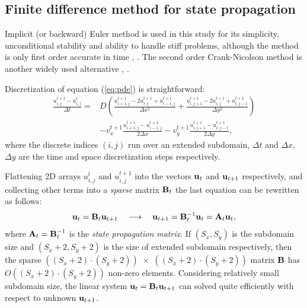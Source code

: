 \documentclass[acmsmall,review,anonymous]{acmart}\settopmatter{printfolios=true,printccs=false,printacmref=false}
\begin{document}
\subsection{Finite difference method for state propagation\label{sec:finit-diff}}

Implicit (or backward) Euler method is used in this study for its simplicity, unconditional stability and ability to handle stiff problems, although the method is only first order accurate in time \cite{Sauer11}, \cite{Butcher03}. The second order Crank-Nicolson method is another widely used alternative \cite{Crank47}, \cite{Thomas95}.

\newcommand{\myu}[3]{u_{{#1},{#2}}^{#3}}
Discretization of equation (\ref{eq:pde}) is straightforward: 
\begin{equation}
\begin{aligned}
\frac{\myu{i}{j}{t+1} - \myu{i}{j}{t}}{\Delta t} = {} &
D \left(
\frac{\myu{i+1}{j}{t+1} - 2\myu{i}{j}{t+1} + \myu{i-1}{j}{t+1}}{\Delta{x}^2} +
\frac{\myu{i}{j+1}{t+1} - 2\myu{i}{j}{t+1} + \myu{i}{j-1}{t+1}}{\Delta{y}^2}
\right) \\
&
-v_x^{t+1} \frac{\myu{i+1}{j}{t+1} - \myu{i-1}{j}{t+1}}{2\Delta{x}} 
-v_y^{t+1} \frac{\myu{i}{j+1}{t+1} - \myu{i}{j-1}{t+1}}{2\Delta{y}},
\end{aligned}
\label{eq:discrete-pde}
\end{equation}
where the discrete indices $(i,j)$ run over an extended subdomain, $\Delta{t}$ and $\Delta{x}$, $\Delta{y}$ are the time and space discretization steps respectively.

Flattening 2D arrays $\myu{i}{j}{t}$ and $\myu{i}{j}{t+1}$ into the vectors ${\bf u}_{t}$ and ${\bf u}_{t+1}$ respectively, and collecting other terms into a \textit{sparse} matrix ${\bf B}_t$ the last equation can be rewritten as follows:
\begin{equation}
{\bf u}_{t} = {\bf B}_t {\bf u}_{t+1} \quad \longrightarrow \quad
{\bf u}_{t+1} = {\bf B}^{-1}_t {\bf u}_{t} = {\bf A}_t {\bf u}_{t},
\label{eq:state-propag}
\end{equation}
where ${\bf A}_t = {\bf B}^{-1}_t$ is the \textit{state propagation matrix}. If $(S_x,S_y)$ is the subdomain size and $(S_x\!+\!2,S_y\!+\!2)$ is the size of extended subdomain respectively, then the sparse $((S_x\!+\!2)\!\cdot\!(S_y\!+\!2))\,\,{\times}\,\,((S_x\!+\!2)\!\cdot\!(S_y\!+\!2))$ matrix ${\bf B}$ has $O((S_x\!+\!2)\!\cdot\!(S_y\!+\!2))$ non-zero elements. Considering relatively small subdomain size, the linear system ${\bf u}_{t} = {\bf B}_t {\bf u}_{t+1}$ can solved quite efficiently with respect to unknown ${\bf u}_{t+1}$.
\end{document}

